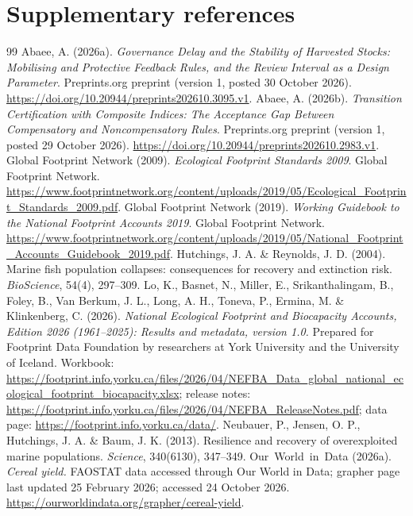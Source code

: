 \documentclass[11pt,a4paper]{article}
\begin{document}
\section*{Supplementary references}
\begin{thebibliography}{99}
\footnotesize
{} Abaee, A. (2026a). \emph{Governance Delay and the Stability of Harvested Stocks: Mobilising and Protective Feedback Rules, and the Review Interval as a Design Parameter}. Preprints.org preprint (version 1, posted 30 October 2026). \url{https://doi.org/10.20944/preprints202610.3095.v1}.
 Abaee, A. (2026b). \emph{Transition Certification with Composite Indices: The Acceptance Gap Between Compensatory and Noncompensatory Rules}. Preprints.org preprint (version 1, posted 29 October 2026). \url{https://doi.org/10.20944/preprints202610.2983.v1}.
 Global Footprint Network (2009). \emph{Ecological Footprint Standards 2009}. Global Footprint Network. \url{https://www.footprintnetwork.org/content/uploads/2019/05/Ecological_Footprint_Standards_2009.pdf}.
 Global Footprint Network (2019). \emph{Working Guidebook to the National Footprint Accounts 2019}. Global Footprint Network. \url{https://www.footprintnetwork.org/content/uploads/2019/05/National_Footprint_Accounts_Guidebook_2019.pdf}.
 Hutchings, J. A. \& Reynolds, J. D. (2004). Marine fish population collapses: consequences for recovery and extinction risk. \emph{BioScience}, 54(4), 297--309.
 Lo, K., Basnet, N., Miller, E., Srikanthalingam, B., Foley, B., Van Berkum, J. L., Long, A. H., Toneva, P., Ermina, M. \& Klinkenberg, C. (2026). \emph{National Ecological Footprint and Biocapacity Accounts, Edition 2026 (1961--2025): Results and metadata, version 1.0.} Prepared for Footprint Data Foundation by researchers at York University and the University of Iceland. Workbook: \url{https://footprint.info.yorku.ca/files/2026/04/NEFBA_Data_global_national_ecological_footprint_biocapacity.xlsx}; release notes: \url{https://footprint.info.yorku.ca/files/2026/04/NEFBA_ReleaseNotes.pdf}; data page: \url{https://footprint.info.yorku.ca/data/}.
 Neubauer, P., Jensen, O. P., Hutchings, J. A. \& Baum, J. K. (2013). Resilience and recovery of overexploited marine populations. \emph{Science}, 340(6130), 347--349.
 Our~World~in~Data (2026a). \emph{Cereal yield.} FAOSTAT data accessed through Our World in Data; grapher page last updated 25 February 2026; accessed 24 October 2026. \url{https://ourworldindata.org/grapher/cereal-yield}.

\end{thebibliography}
\end{document}
